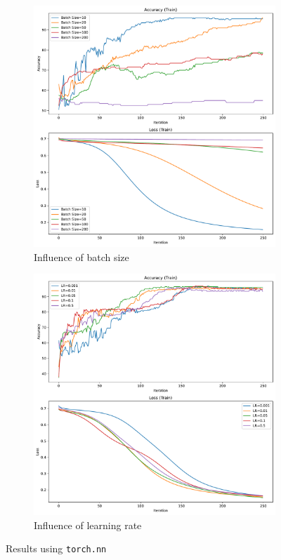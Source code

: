 \begin{figure}[H]\ContinuedFloat
    \centering
    \begin{subfigure}{0.45\textwidth}
        \centering
        \includegraphics[width=\textwidth]{figs/NN/torchnn_batch_size.pdf}
        \caption{Influence of batch size}
        \label{subfig:torchnn_batchsize}
    \end{subfigure}
    \begin{subfigure}{0.45\textwidth}
        \centering
        \includegraphics[width=\textwidth]{figs/NN/torchnn_lr.pdf}
        \caption{Influence of learning rate}
        \label{subfig:torchnn_lr}
    \end{subfigure}
    \caption{Results using \texttt{torch.nn}}
    \label{fig:torchnn}
\end{figure}

